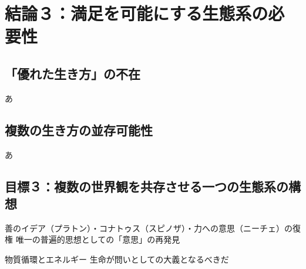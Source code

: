 \section{結論３：満足を可能にする生態系の必要性}\label{ux7d50ux8ad6uxff13ux6e80ux8db3ux3092ux53efux80fdux306bux3059ux308bux751fux614bux7cfbux306eux5fc5ux8981ux6027}

\subsection{「優れた生き方」の不在}\label{ux512aux308cux305fux751fux304dux65b9ux306eux4e0dux5728}

あ

\subsection{複数の生き方の並存可能性}\label{ux8907ux6570ux306eux751fux304dux65b9ux306eux4e26ux5b58ux53efux80fdux6027}

あ

\subsection{目標３：複数の世界観を共存させる一つの生態系の構想}\label{ux76eeux6a19uxff13ux8907ux6570ux306eux4e16ux754cux89b3ux3092ux5171ux5b58ux3055ux305bux308bux4e00ux3064ux306eux751fux614bux7cfbux306eux69cbux60f3}

善のイデア（プラトン）・コナトゥス（スピノザ）・力への意思（ニーチェ）の復権
唯一の普遍的思想としての「意思」の再発見

物質循環とエネルギー 生命が問いとしての大義となるべきだ
